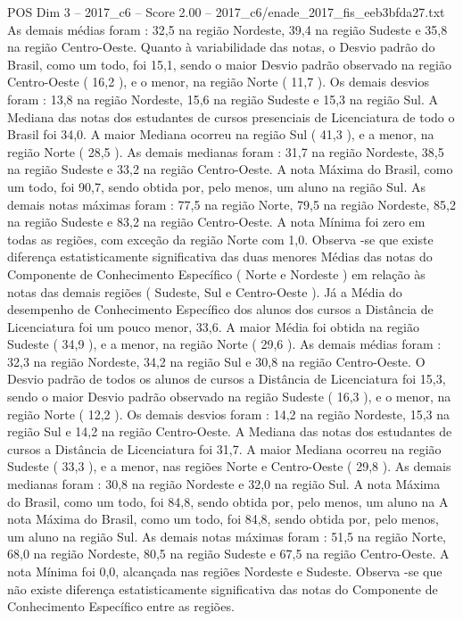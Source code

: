 \begin{textsample}{POS Dim 3 – 2017\_c6 – Score 2.00 – 2017\_c6/enade\_2017\_fis\_eeb3bfda27.txt}
As demais médias foram : 32,5 na região Nordeste, 39,4 na região Sudeste e 35,8 na região Centro-Oeste.
Quanto à variabilidade das notas, o Desvio padrão do Brasil, como um todo, foi 15,1, sendo o maior Desvio padrão observado na região Centro-Oeste ( 16,2 ), e o menor, na região Norte ( 11,7 ).
Os demais desvios foram : 13,8 na região Nordeste, 15,6 na região Sudeste e 15,3 na região Sul.
A Mediana das notas dos estudantes de cursos presenciais de Licenciatura de todo o Brasil foi 34,0.
A maior Mediana ocorreu na região Sul ( 41,3 ), e a menor, na região Norte ( 28,5 ).
As demais medianas foram : 31,7 na região Nordeste, 38,5 na região Sudeste e 33,2 na região Centro-Oeste.
A nota Máxima do Brasil, como um todo, foi 90,7, sendo obtida por, pelo menos, um aluno na região Sul.
As demais notas máximas foram : 77,5 na região Norte, 79,5 na região Nordeste, 85,2 na região Sudeste e 83,2 na região Centro-Oeste.
A nota Mínima foi zero em todas as regiões, com exceção da região Norte com 1,0.
Observa -se que existe diferença estatisticamente significativa das duas menores Médias das notas do Componente de Conhecimento Específico ( Norte e Nordeste ) em relação às notas das demais regiões ( Sudeste, Sul e Centro-Oeste ).
Já a Média do desempenho de Conhecimento Específico dos alunos dos cursos a Distância de Licenciatura foi um pouco menor, 33,6.
A maior Média foi obtida na região Sudeste ( 34,9 ), e a menor, na região Norte ( 29,6 ).
As demais médias foram : 32,3 na região Nordeste, 34,2 na região Sul e 30,8 na região Centro-Oeste.
O Desvio padrão de todos os alunos de cursos a Distância de Licenciatura foi 15,3, sendo o maior Desvio padrão observado na região Sudeste ( 16,3 ), e o menor, na região Norte ( 12,2 ).
Os demais desvios foram : 14,2 na região Nordeste, 15,3 na região Sul e 14,2 na região Centro-Oeste.
A Mediana das notas dos estudantes de cursos a Distância de Licenciatura foi 31,7.
A maior Mediana ocorreu na região Sudeste ( 33,3 ), e a menor, nas regiões Norte e Centro-Oeste ( 29,8 ).
As demais medianas foram : 30,8 na região Nordeste e 32,0 na região Sul.
A nota Máxima do Brasil, como um todo, foi 84,8, sendo obtida por, pelo menos, um aluno na A nota Máxima do Brasil, como um todo, foi 84,8, sendo obtida por, pelo menos, um aluno na região Sul.
As demais notas máximas foram : 51,5 na região Norte, 68,0 na região Nordeste, 80,5 na região Sudeste e 67,5 na região Centro-Oeste.
A nota Mínima foi 0,0, alcançada nas regiões Nordeste e Sudeste.
Observa -se que não existe diferença estatisticamente significativa das notas do Componente de Conhecimento Específico entre as regiões.

\end{textsample}
